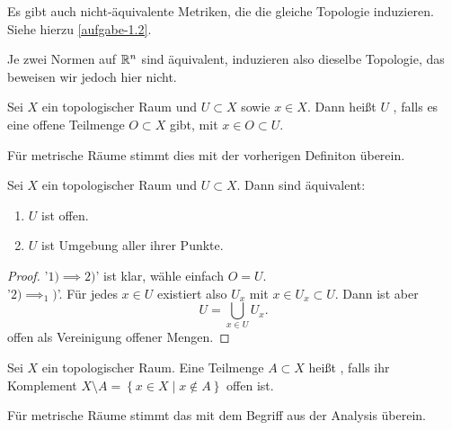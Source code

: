 \begin{remark}
    Es gibt auch nicht-äquivalente Metriken, die die gleiche Topologie induzieren. Siehe hierzu \autoref{aufgabe-1.2}.
\end{remark}
\begin{remark}
    Je zwei Normen auf $\mathbb{R}^n$ sind äquivalent, induzieren also dieselbe Topologie, das beweisen wir jedoch hier nicht.
\end{remark}

\begin{definition}[Umgebung]\label{def:umgebung}
    Sei $X$ ein topologischer Raum und $U\subset X$ sowie $x\in X$. Dann heißt $U$ , falls es eine offene Teilmenge  $O\subset X$ gibt, mit $x\in O\subset U$.
\end{definition}
\begin{remark}
    Für metrische Räume stimmt dies mit der vorherigen Definiton überein.
\end{remark}


\begin{theorem}\label{thm:offene-menge-ist-umgebung-all-ihrer-punkte}
    Sei $X$ ein topologischer Raum und  $U\subset X$. Dann sind äquivalent:
    \begin{enumerate}[1)]
        \item $U$ ist offen.
        \item $U$ ist Umgebung aller ihrer Punkte.
    \end{enumerate}
\end{theorem}
\begin{proof}
    '$1) \implies 2)$' ist klar, wähle einfach $O = U$. \\
    '$2)\implies_1)$'. Für jedes $x\in U$ existiert also $U_x$ mit  $x\in U_x \subset U$. Dann ist aber
    \[
    U = \bigcup_{x\in U} U_x
    .\] 
    offen als Vereinigung offener Mengen.
\end{proof}

\begin{definition*}\label{def:abgeschlossene-menge}
    Sei $X$ ein topologischer Raum. Eine Teilmenge  $A\subset X$ heißt , falls ihr Komplement $X \setminus A = \left \{x\in X \mid  x\not\in A\right\} $ offen ist.
\end{definition*}
\begin{remark}
    Für metrische Räume stimmt das mit dem Begriff aus der Analysis überein.
\end{remark}

